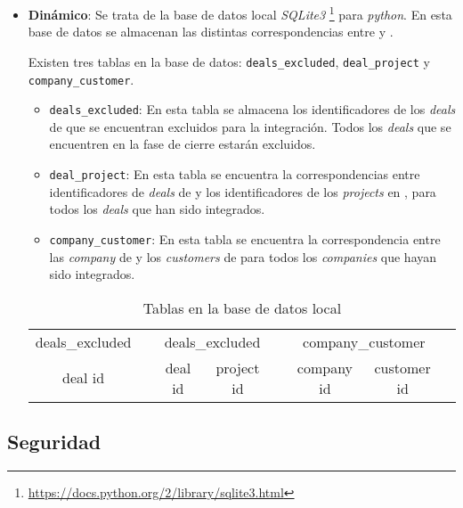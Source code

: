 \begin{itemize}[leftmargin=*]
\item \textbf{Dinámico}: Se trata de la base de datos local \textit{SQLite3} \footnote{\url{https://docs.python.org/2/library/sqlite3.html}} para \textit{python}. %
 En esta base de datos se almacenan las distintas correspondencias entre \hs{} y \wday.
 
 Existen tres tablas en la base de datos: \texttt{deals\_excluded}, \texttt{deal\_project} y \texttt{company\_customer}.
 
 
 \begin{itemize}
	\item \texttt{deals\_excluded}: En esta tabla se almacena los identificadores de los \textit{deals} de \hs{} 
	que se encuentran excluidos para la integración. Todos los \textit{deals} que se encuentren en la fase de
	cierre estarán excluidos.
	\item \texttt{deal\_project}: En esta tabla se encuentra la correspondencias entre identificadores 
	de \textit{deals} de \hs{} y los identificadores de los \textit{projects} en \wday{}, para todos los \textit{deals} que han sido integrados.
	\item \texttt{company\_customer}: En esta tabla se encuentra la correspondencia entre las \textit{company} de \hs{} y los \textit{customers} de \wday{}
	para todos los \textit{companies} que hayan sido integrados.
 \end{itemize}
 

\begin{table}[H]
		\centering
		\begin{tabular}{
		|c|c@{\hskip 1cm} 
		|c|c|c@{\hskip 1cm} 
		|c|c|c@{\hskip 1cm}
		}
		\cline{1-1}\cline{3-4}\cline{6-7}
		deals\_excluded && \multicolumn{2}{c|}{deals\_excluded} && \multicolumn{2}{c|}{company\_customer} \\
	\cline{1-1}\cline{3-4}\cline{6-7}
	deal id && deal id & project id && company id & customer id \\
	\cline{1-1}\cline{3-4}\cline{6-7}
	\end{tabular}
	\caption{Tablas en la base de datos local}
	\label{tab:tables}
\end{table}

\end{itemize}




\subsection{Seguridad}
\label{subsec:security}

